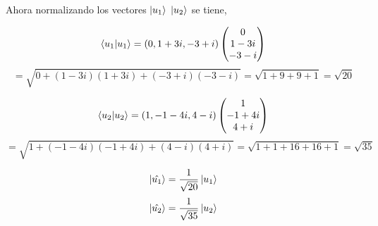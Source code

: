 \documentclass[12pt,a4paper]{article}
\begin{document}
\begin{enumerate}
\begin{enumerate}
Ahora normalizando los vectores $ \ket{u_{1}} $ $ \ket{u_{2}} $ se tiene,

\[
\braket{u_{1}|u_{1}} = (0, 1+3i, -3+i)\begin{pmatrix}
0 \\
1-3i\\ 
-3-i \\  
\end{pmatrix}
\]
\[
= \sqrt{0+(1-3i)(1+3i)+(-3+i)(-3-i)} = \sqrt{1+9+9+1} = \sqrt{20} 
\]

\[
\braket{u_{2}|u_{2}} = (1, -1-4i, 4-i)\begin{pmatrix}
1 \\
-1+4i \\
4+i \\  
\end{pmatrix}
\]
\[
= \sqrt{1+(-1-4i)(-1+4i)+(4-i)(4+i)} = \sqrt{1+1+16+16+1} = \sqrt{35} 
\]

\[
\ket{\hat{u_{1}}} = \frac{1}{\sqrt{20}} \ket{u_{1}}
\]
\[
\ket{\hat{u_{2}}} = \frac{1}{\sqrt{35}} \ket{u_{2}}
\]


\end{enumerate}

\end{enumerate}
\end{document}
